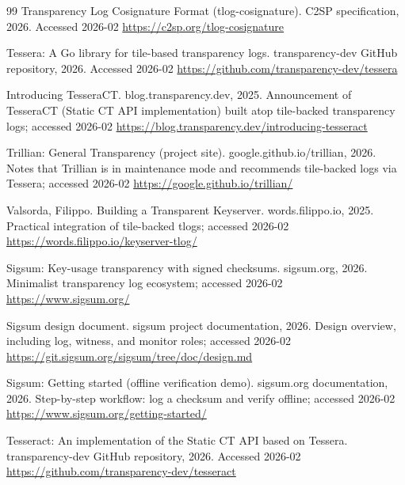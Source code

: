 \documentclass[11pt]{article}
\begin{document}
\begin{thebibliography}{99}
\newblock Transparency Log Cosignature Format (tlog-cosignature).
\newblock C2SP specification, 2026.
\newblock Accessed 2026-02
\newblock \url{https://c2sp.org/tlog-cosignature}

\newblock Tessera: A Go library for tile-based transparency logs.
\newblock transparency-dev GitHub repository, 2026.
\newblock Accessed 2026-02
\newblock \url{https://github.com/transparency-dev/tessera}

\newblock Introducing TesseraCT.
\newblock blog.transparency.dev, 2025.
\newblock Announcement of TesseraCT (Static CT API implementation) built atop tile-backed transparency logs; accessed 2026-02
\newblock \url{https://blog.transparency.dev/introducing-tesseract}

\newblock Trillian: General Transparency (project site).
\newblock google.github.io/trillian, 2026.
\newblock Notes that Trillian is in maintenance mode and recommends tile-backed logs via Tessera; accessed 2026-02
\newblock \url{https://google.github.io/trillian/}

Valsorda, Filippo.
\newblock Building a Transparent Keyserver.
\newblock words.filippo.io, 2025.
\newblock Practical integration of tile-backed tlogs; accessed 2026-02
\newblock \url{https://words.filippo.io/keyserver-tlog/}

\newblock Sigsum: Key-usage transparency with signed checksums.
\newblock sigsum.org, 2026.
\newblock Minimalist transparency log ecosystem; accessed 2026-02
\newblock \url{https://www.sigsum.org/}

\newblock Sigsum design document.
\newblock sigsum project documentation, 2026.
\newblock Design overview, including log, witness, and monitor roles; accessed 2026-02
\newblock \url{https://git.sigsum.org/sigsum/tree/doc/design.md}

\newblock Sigsum: Getting started (offline verification demo).
\newblock sigsum.org documentation, 2026.
\newblock Step-by-step workflow: log a checksum and verify offline; accessed 2026-02
\newblock \url{https://www.sigsum.org/getting-started/}

\newblock Tesseract: An implementation of the Static CT API based on Tessera.
\newblock transparency-dev GitHub repository, 2026.
\newblock Accessed 2026-02
\newblock \url{https://github.com/transparency-dev/tesseract}


\end{thebibliography}
\end{document}
